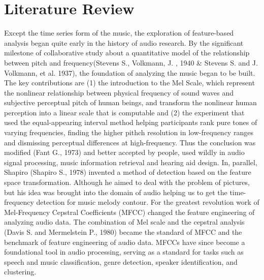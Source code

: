 \section{Literature Review}
Except the time series form of the music, the exploration of feature-based analysis began quite early in the history of audio research. By the significant milestone of collaborative study about a quantitative model of the relationship between pitch and frequency(Stevens S., Volkmann, J. , 1940 \& Stevens S. and J. Volkmann, et al. 1937), the foundation of analyzing the music began to be built. The key contributions are (1) the introduction to the Mel Scale, which represent the nonlinear relationship between physical frequency of sound waves and subjective perceptual pitch of human beings, and transform the nonlinear human perception into a linear scale that is computable and (2) the experiment that used the equal-appearing interval method helping participants rank pure tones of varying frequencies, finding the higher pithch resolution in low-frequency ranges and dismissing perceptual differences at high-frequency. Thus the conclusion was modified (Fant G., 1973) and better accepted by people, used wildly in audio signal processing, music information retrieval and hearing aid design. In, parallel, Shapiro (Shapiro S., 1978) invented a method of detection based on the feature space transformation. Although he aimed to deal with the problem of pictures, but his idea was brought into the domain of audio helping us to get the time-frequency detection for music melody contour. For the greatest revolution work of Mel-Frequency Cepstral Coefficients (MFCC) changed the feature engineering of analyzing audio data. The combination of Mel scale and the cepstral analysis (Davis S. and Mermelstein P., 1980) became the standard of MFCC and the benchmark of feature engineering of audio data. MFCCs have since become a foundational tool in audio processing, serving as a standard for tasks such as speech and music classification, genre detection, speaker identification, and clustering.\\
\\
